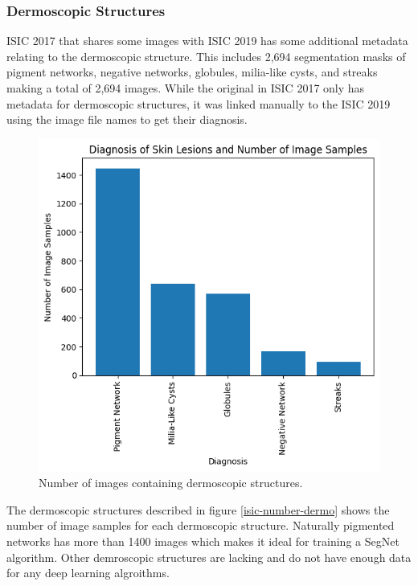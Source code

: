 \subsubsection{Dermoscopic Structures}

ISIC 2017 that shares some images with ISIC 2019 has some additional metadata relating to the dermoscopic structure. This includes 2,694 segmentation masks of pigment networks, negative networks, globules, milia-like cysts, and streaks making a total of 2,694 images. While the original in ISIC 2017 only has metadata for dermoscopic structures, it was linked manually to the ISIC 2019 using the image file names to get their diagnosis.

\begin{figure}
	\centering
	\includegraphics[scale=0.8]{images/ISIC/isic-dermo-number.png}
	\caption{Number of images containing dermoscopic structures.} 
\end{figure} \label{isic-number-dermo}

The dermoscopic structures described in figure \ref{isic-number-dermo} shows the number of image samples for each dermoscopic structure. Naturally pigmented networks has more than 1400 images which makes it ideal for training a SegNet algorithm. Other demroscopic structures are lacking and do not have enough data for any deep learning algroithms.

